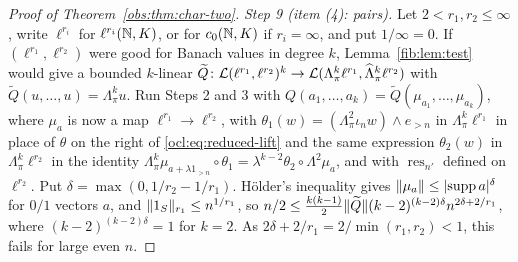 \begin{proof}[Proof of Theorem~\ref{obs:thm:char-two}]
\emph{Step 9 (item (4): pairs).} Let $2<r_1,r_2\le\infty$, write $\ell^{r_i}$ for $\ell^{r_i}(\mathbb N,K)$, or for
$c_0(\mathbb N,K)$ if $r_i=\infty$, and put $1/\infty=0$. If $(\ell^{r_1},\ell^{r_2})$ were good for Banach values in degree
$k$, Lemma~\ref{fib:lem:test} would give a bounded $k$-linear
$\widetilde Q\colon\mathcal L(\ell^{r_1},\ell^{r_2})^k\to\mathcal L(\Lambda^k_\pi\ell^{r_1},\widehat\Lambda^k_\pi\ell^{r_2})$ with
$\widetilde Q(u,\dots,u)=\Lambda^k_\pi u$. Run Steps 2 and 3 with
$Q(a_1,\dots,a_k)=\widetilde Q(\mu_{a_1},\dots,\mu_{a_k})$, where $\mu_a$ is now a map $\ell^{r_1}\to\ell^{r_2}$, with
$\theta_1(w)=(\Lambda^2_\pi\iota_nw)\wedge e_{>n}$ in $\Lambda^k_\pi\ell^{r_1}$ in place of $\theta$ on the right of
\eqref{ocl:eq:reduced-lift} and the same expression $\theta_2(w)$ in $\Lambda^k_\pi\ell^{r_2}$ in the identity
$\Lambda^k_\pi\mu_{a+\lambda1_{>n}}\circ\theta_1=\lambda^{k-2}\theta_2\circ\Lambda^2\mu_a$, and with
$\operatorname{res}_{n'}$ defined on $\ell^{r_2}$. Put $\delta=\max(0,1/r_2-1/r_1)$. H\"older's inequality gives
$\lVert \mu_a\rVert\le\lvert \operatorname{supp}a\rvert^\delta$ for $0/1$ vectors $a$, and $\lVert 1_S\rVert_{r_1}\le n^{1/r_1}$, so
$n/2\le\frac{k(k-1)}2\lVert \widetilde Q\rVert(k-2)^{(k-2)\delta}n^{2\delta+2/r_1}$, where $(k-2)^{(k-2)\delta}=1$ for $k=2$.
As $2\delta+2/r_1=2/\min(r_1,r_2)<1$, this fails for large even $n$.
\end{proof}

